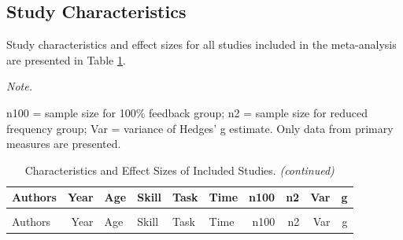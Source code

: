 \documentclass[
  english,
  man,mask,floatsintext]{apa7}
\begin{document}
\hypertarget{study-characteristics}{%
\subsection{Study Characteristics}\label{study-characteristics}}

Study characteristics and effect sizes for all studies included in the meta-analysis are presented in Table \ref{tab:table1}.

\begingroup\fontsize{10}{12}\selectfont

\begin{landscape}
\begin{ThreePartTable}
\begin{TableNotes}
\item \textit{Note.} 
\item n100 = sample size for 100\% feedback group; n2 = sample size for reduced frequency group; Var = variance of Hedges' g estimate. Only data from primary measures are presented.
\end{TableNotes}
\begin{longtable}[l]{lrllllrrrr}
\caption{\label{tab:table1}Characteristics and Effect Sizes of Included Studies.}\\
\toprule
Authors & Year & Age & Skill & Task & Time & n100 & n2 & Var & g\\
\midrule
\endfirsthead
\caption[]{\label{tab:table1}Characteristics and Effect Sizes of Included Studies. \textit{(continued)}}\\
\toprule
Authors & Year & Age & Skill & Task & Time & n100 & n2 & Var & g\\
\midrule
\endhead


\end{longtable}
\end{ThreePartTable}
\end{landscape}
\end{document}
